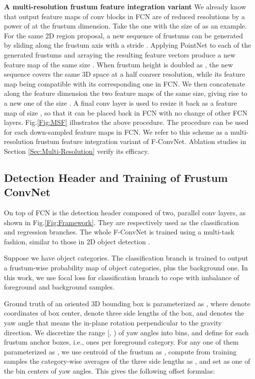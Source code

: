 \documentclass[letterpaper, 10 pt, conference]{ieeeconf}
\begin{document}
\vspace{0.1cm}
\noindent\textbf{A multi-resolution frustum feature integration variant}
We already know that output feature maps of conv blocks in FCN are of reduced resolutions by a power of  at the frustum dimension. Take the one with the size of  as an example. For the same 2D region proposal, a new sequence of  frustums can be generated by sliding along the frustum axis with a stride . Applying PointNet to each of the generated frustums and arraying the resulting feature vectors produce a new feature map of the same size . When frustum height is doubled as , the new sequence covers the same 3D space at a half coarser resolution, while its feature map being compatible with its corresponding one in FCN. We then concatenate along the feature dimension the two feature maps of the same size, giving rise to a new one of the size . A final conv layer is used to resize it back as a feature map of size , so that it can be placed back in FCN with no change of other FCN layers. Fig.\ref{Fig:MSF} illustrates the above procedure. The procedure can be used for each down-sampled feature maps in FCN. We refer to this scheme as a multi-resolution frustum feature integration variant of F-ConvNet. Ablation studies in Section \ref{Sec:Multi-Resolution} verify its efficacy.

\subsection{Detection Header and Training of Frustum ConvNet}

On top of FCN is the detection header composed of two, parallel conv layers, as shown in Fig.\ref{Fig:Framework}. They are respectively used as the classification and regression branches. The whole F-ConvNet is trained using a multi-task fashion, similar to those in 2D object detection \cite{girshick2015fast,ren2015faster, liu2016ssd}.

Suppose we have  object categories. The classification branch is trained to output a  frustum-wise probability map of object categories, plus the background one. In this work, we use focal loss \cite{lin2017focal} for classification branch to cope with imbalance of foreground and background samples. 

Ground truth of an oriented 3D bounding box is parameterized as , where  denote coordinates of box center,   denote three side lengths of the box, and  denotes the yaw angle that means the in-plane rotation perpendicular to the gravity direction. We discretize the range [, ) of yaw angles into  bins, and define for each frustum  anchor boxes, i.e.,  ones per foreground category. For any one of them parameterized as , we use centroid of the frustum as , compute from training samples the category-wise averages of the three side lengths as , and set  as one of the bin centers of yaw angles. This gives the following offset formulas:
\end{document}
